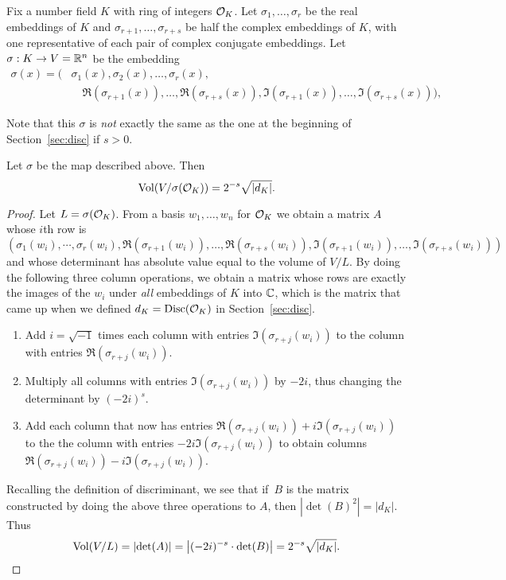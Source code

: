 Fix a number field $K$ with ring of integers $\mathcal{O}_K$.
Let $\sigma_1,\ldots, \sigma_r$ be the real embeddings
of $K$ and $\sigma_{r+1},\ldots, \sigma_{r+s}$ be half
the complex embeddings of $K$, with one representative of
each pair of complex conjugate embeddings.
Let $\sigma:K \to V=\mathbb{R}^n$ be the embedding
\begin{align*}
  \sigma(x) = \big(&\sigma_1(x), \sigma_2(x),\ldots, \sigma_r(x),\\
     &\quad \Re(\sigma_{r+1}(x)), \ldots, \Re(\sigma_{r+s}(x)),
      \Im(\sigma_{r+1}(x)), \ldots, \Im(\sigma_{r+s}(x))\big),
\end{align*}
\begin{warning}
Note that this $\sigma$ is {\em not} exactly the same as the one
at the beginning of Section~\ref{sec:disc} if $s>0$.
\end{warning}
\begin{lemma}\label{lem:volok}
Let $\sigma$ be the map described above. Then
\[
  \operatorname{Vol}(V/\sigma(\mathcal{O}_K)) = 2^{-s} \sqrt{\left|d_K\right|}.
\]
\end{lemma}
\begin{proof}
Let $L=\sigma(\mathcal{O}_K)$.
From a basis $w_1,\ldots, w_n$ for $\mathcal{O}_K$ we obtain a matrix $A$
whose $i$th row is
\[
(\sigma_1(w_i), \cdots, \sigma_r(w_i),
\Re(\sigma_{r+1}(w_i)),\ldots, \Re(\sigma_{r+s}(w_i)),
\Im(\sigma_{r+1}(w_i)),\ldots, \Im(\sigma_{r+s}(w_i)))
\]
and whose determinant has absolute value equal to the volume
of $V/L$.  By doing the following three column operations,
we obtain a matrix whose rows are exactly the images of
the $w_i$ under {\em all} embeddings of $K$ into $\mathbb{C}$, which
is the matrix that came up when we defined
$d_K=\operatorname{Disc}(\mathcal{O}_K)$ in Section~\ref{sec:disc}.
\begin{enumerate}
\item Add $i=\sqrt{-1}$ times each column with entries $\Im(\sigma_{r+j}(w_i))$
to the column with entries $\Re(\sigma_{r+j}(w_i))$.
\item Multiply all columns with entries $\Im(\sigma_{r+j}(w_i))$
  by $-2i$, thus changing the determinant by $(-2i)^s$.
\item Add each column that now has entries
$\Re(\sigma_{r+j}(w_i))+i\Im(\sigma_{r+j}(w_i))$
to the the column with entries $-2i\Im(\sigma_{r+j}(w_i))$
to obtain columns $\Re(\sigma_{r+j}(w_i))-i\Im(\sigma_{r+j}(w_i))$.
\end{enumerate}
Recalling the definition of discriminant, we see that if~$B$
is the matrix constructed by doing the above three
operations to $A$, then $\left|\det(B)^2\right| = \left|d_K\right|$.
Thus
\[
  \operatorname{Vol}(V/L) = \left|\det(A)\right| = \left|(-2i)^{-s}\cdot \det(B)\right| = 2^{-s}\sqrt{\left|d_K\right|}.
\]
\end{proof}

